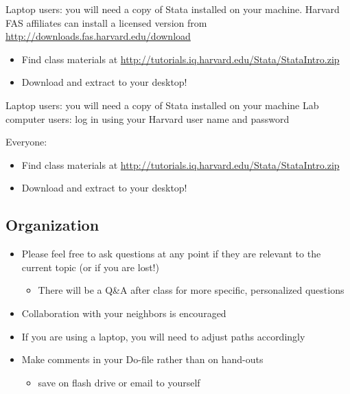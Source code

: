 \documentclass[]{book}
\providecommand{\tightlist}{%
  \setlength{\itemsep}{0pt}\setlength{\parskip}{0pt}}
\begin{document}
Laptop users: you will need a copy of Stata installed on your machine.
Harvard FAS affiliates can install a licensed version from
\url{http://downloads.fas.harvard.edu/download}

\begin{itemize}
\tightlist
\item
  Find class materials at
  \url{http://tutorials.iq.harvard.edu/Stata/StataIntro.zip}
\item
  Download and extract to your desktop!
\end{itemize}

Laptop users: you will need a copy of Stata installed on your machine
Lab computer users: log in using your Harvard user name and password

Everyone:

\begin{itemize}
\tightlist
\item
  Find class materials at
  \url{http://tutorials.iq.harvard.edu/Stata/StataIntro.zip}
\item
  Download and extract to your desktop!
\end{itemize}

\subsection{Organization}\label{organization}

\begin{itemize}
\tightlist
\item
  Please feel free to ask questions at any point if they are relevant to
  the current topic (or if you are lost!)

  \begin{itemize}
  \tightlist
  \item
    There will be a Q\&A after class for more specific, personalized
    questions
  \end{itemize}
\item
  Collaboration with your neighbors is encouraged
\item
  If you are using a laptop, you will need to adjust paths accordingly
\item
  Make comments in your Do-file rather than on hand-outs

  \begin{itemize}
  \tightlist
  \item
    save on flash drive or email to yourself
  \end{itemize}
\end{itemize}
\end{document}
